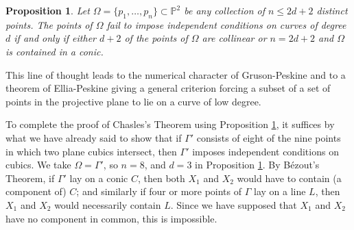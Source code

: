 \documentclass{bull-l}
\newtheorem{prop}{Proposition}
\theoremstyle{pplain}
\theoremstyle{definition}
\begin{document}
\begin{prop} \label{prop:one}
Let $\Omega=\{p_1,\dots,p_n\}\subset \mathbb{P}^2$ be any
collection of $n\le 2d+2$ distinct points.  The points of $\Omega$ fail to
impose independent conditions on curves of degree $d$ if and only if either
$d+2$ of the points of $\Omega$ are collinear or $n=2d+2$ and $\Omega$ is
contained in a  conic.
\end{prop}

This line of thought leads to the numerical character of Gruson-Peskine and to
a theorem of Ellia-Peskine \cite{EP} giving a general criterion forcing a
subset of a set of points in the projective plane to lie on a curve of low
degree.

To complete the proof of Chasles's Theorem using Proposition \ref{prop:one}, it
suffices by what we have already said to show that if $\Gamma'$ consists of
eight of the nine points in which two plane cubics intersect, then $\Gamma'$
imposes independent conditions on cubics.  We take $\Omega=\Gamma'$, so $n=8$,
and $d=3$ in Proposition \ref{prop:one}.  By B\'ezout's Theorem, if $\Gamma'$ lay
on a conic $C$, then both $X_1$ and $X_2$ would have to contain (a component
of) $C$; and similarly if four or more points of $\Gamma$ lay on a line $L$,
then $X_1$ and $X_2$ would necessarily contain $L$.  Since we have supposed
that $X_1$ and $X_2$ have no component in common, this is impossible.
\end{document}
